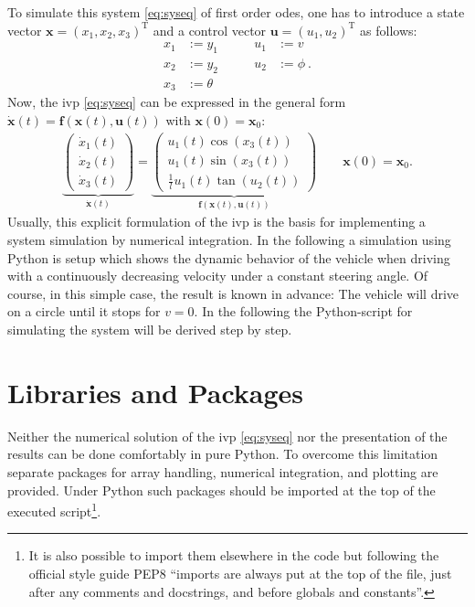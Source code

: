 \documentclass[a4paper,11pt,headinclude=true,headsepline,parskip=half,DIV=12]{scrartcl}
\newcommand{\py}{Python\xspace}
\newcommand{\uu}{\mathbf{u}}
\newcommand{\f}{\mathbf{f}}
\newcommand{\x}{\mathbf{x}}
\newcommand{\xZero}{\mathbf{x}_0}
\begin{document}
To simulate this system \eqref{eq:syseq} of first order \glspl{ode}, one has to introduce a state vector $\x=(x_1,x_2,x_3)^\mathrm{T}$ and a control vector $\uu=(u_1,u_2)^\mathrm{T}$ as follows:
\begin{subequations}
\begin{alignat}{2}
x_1 &:= y_1 &\qquad u_1 &:= v\\
x_2 &:= y_2 &\qquad  u_2 &:= \phi \:. \\
x_3 &:= \theta
\end{alignat}
\end{subequations}
Now, the \gls{ivp} \eqref{eq:syseq} can be expressed in the general form $\dot{\x}(t)=\f(\x(t),\uu(t))$ with $\x(0) = \xZero$:
\label{eq:ss_system}
\begin{align} \label{eq:odesys}
\underbrace{\begin{pmatrix} \dot{x}_1(t) \\ \dot{x}_2(t) \\ \dot{x}_3(t) \end{pmatrix}}_{\dot{\x}(t)} = \underbrace{\begin{pmatrix}  u_1(t) \cos(x_3(t)) \\ u_1(t) \sin(x_3(t)) \\ \frac{1}{l}u_1(t) \tan(u_2(t)) \end{pmatrix}}_{\f(\x(t),\uu(t))} \qquad \x(0) = \xZero.
\end{align}
Usually, this explicit formulation of the \gls{ivp} is the basis for implementing a system simulation by numerical integration. In the following a simulation using \py is setup which shows the dynamic behavior of the vehicle when driving with a continuously decreasing velocity under a constant steering angle. Of course, in this simple case, the result is known in advance: The vehicle will drive on a circle until it stops for $v = 0$. In the following the \py-script for simulating the system will be derived step by step.


\section{Libraries and Packages}
Neither the numerical solution of the \gls{ivp} \eqref{eq:syseq} nor the presentation of the results can be done comfortably in pure \py. To overcome this limitation separate packages for array handling, numerical integration, and plotting are provided. Under \py such packages should be imported at the top of the executed script\footnote{It is also possible to import them elsewhere in the code but following the official style guide PEP8 ``imports are always put at the top of the file, just after any comments and docstrings, and before globals and constants''.}.
\end{document}
